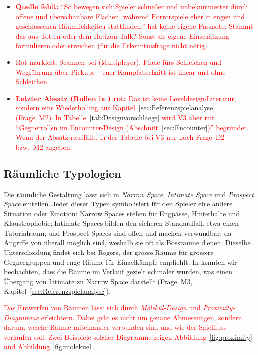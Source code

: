 \documentclass[../Main.tex]{subfiles}
\begin{document}
\begin{itemize}[leftmargin=1.5cm]
    \item \textcolor{red}{\textbf{Quelle fehlt:} \enquote{So bewegen sich Spieler schneller und unbekümmerter durch offene und überschaubare Flächen, während Horrorspiele eher in engen und geschlossenen Räumlichkeiten stattfinden.} hat keine eigene Fussnote. Stammt das aus Totten oder dem Horizon-Talk? Sonst als eigene Einschätzung formulieren oder streichen (für die Erkenntnisfrage nicht nötig).}
    \item \textcolor{red}{Rot markiert: Scannen bei  (Multiplayer), Pfade fürs Schleichen und Wegführung über Pickups -- euer Kampfabschnitt ist linear und ohne Schleichen.}
    \item \textcolor{red}{\textbf{Letzter Absatz (Rollen in ) rot:} Das ist keine Leveldesign-Literatur, sondern eine Wiederholung aus Kapitel~\ref{sec:Referenzspielanalyse} (Frage~M2). In Tabelle~\ref{tab:Designvorschlaege} wird V3 aber mit \enquote{Gegnerrollen im Encounter-Design (Abschnitt~\ref{sec:Encounter})} begründet. Wenn der Absatz rausfällt, in der Tabelle bei V3 nur noch Frage~D2 bzw.\ M2 angeben.}
\end{itemize}

\subsection{Räumliche Typologien} \label{sec:Raumtypologien}
Die räumliche Gestaltung lässt sich in \textit{Narrow Space}, \textit{Intimate Space} und \textit{Prospect Space} einteilen. Jeder dieser Typen symbolisiert für den Spieler eine andere Situation oder Emotion: Narrow Spaces stehen für Engpässe, Hinterhalte und Klaustrophobie; Intimate Spaces bilden den sicheren Standardfall, etwa einen Tutorialraum; und Prospect Spaces sind offen und machen verwundbar, da Angriffe von überall möglich sind, weshalb sie oft als Bossräume dienen.\autocite[161--168]{totten2014architectural} Dieselbe Unterscheidung findet sich bei Rogers, der grosse Räume für grössere Gegnergruppen und enge Räume für Einzelkämpfe empfiehlt.\autocite[245]{rogers2014levelup} In  konnten wir beobachten, dass die Räume im Verlauf gezielt schmaler wurden, was einen Übergang von Intimate zu Narrow Space darstellt (Frage~M3, Kapitel~\ref{sec:Referenzspielanalyse}).

\textcolor{red}{Das Entwerfen von Räumen lässt sich durch \textit{Molekül-Design} und \textit{Proximity-Diagramme} erleichtern. Dabei geht es nicht um genaue Abmessungen, sondern darum, welche Räume miteinander verbunden sind und wie der Spielfluss verlaufen soll.\autocite[168--169]{totten2014architectural} Zwei Beispiele solcher Diagramme zeigen Abbildung~\ref{fig:proximity} und Abbildung~\ref{fig:molekuel}.}
\end{document}
